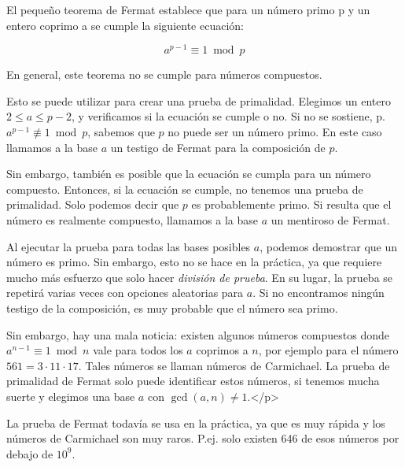 El pequeño teorema de Fermat  establece que para un número primo p y un entero coprimo a se cumple la siguiente ecuación:

$$a^{p-1} \equiv 1 \bmod p$$

En general, este teorema no se cumple para números compuestos. 

Esto se puede utilizar para crear una prueba de primalidad.
Elegimos un entero $2 \le a \le p - 2$, y verificamos si la ecuación se cumple o no.
Si no se sostiene, p. $a^{p-1} \not\equiv 1 \bmod p$, sabemos que $p$ no puede ser un número primo.
En este caso llamamos a la base $a$ un testigo de Fermat para la composición de $p$. 

Sin embargo, también es posible que la ecuación se cumpla para un número compuesto.
Entonces, si la ecuación se cumple, no tenemos una prueba de primalidad.
Solo podemos decir que $p$ es probablemente primo.
Si resulta que el número es realmente compuesto, llamamos a la base $a$ un mentiroso de Fermat. 

Al ejecutar la prueba para todas las bases posibles $a$, podemos demostrar que un número es primo.
Sin embargo, esto no se hace en la práctica, ya que requiere mucho más esfuerzo que solo hacer \emph{división de prueba}.
En su lugar, la prueba se repetirá varias veces con opciones aleatorias para $a$.
Si no encontramos ningún testigo de la composición, es muy probable que el número sea primo.



Sin embargo, hay una mala noticia:
existen algunos números compuestos donde $a^{n-1} \equiv 1 \bmod n$ vale para todos los $a$ coprimos a $n$, por ejemplo para el número $561 = 3 \cdot 11 \cdot 17$.
Tales números se llaman números de Carmichael.
La prueba de primalidad de Fermat solo puede identificar estos números, si tenemos mucha suerte y elegimos una base $a$ con $\gcd(a, n) \ne 1$.</p>

La prueba de Fermat todavía se usa en la práctica, ya que es muy rápida y los números de Carmichael son muy raros.
P.ej. solo existen 646 de esos números por debajo de $10^9$.